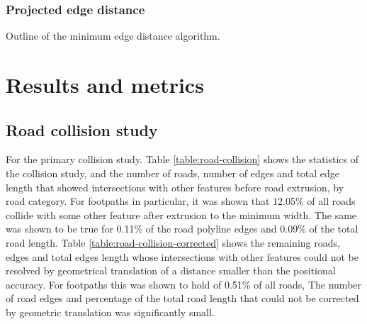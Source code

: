 \documentclass{kththesis}
\begin{document}
\subsection{Projected edge distance}

Outline of the minimum edge distance algorithm.

\chapter{Results and metrics}

\section{Road collision study}

For the primary collision study.
Table \ref{table:road-collision} shows the statistics of the collision study, and the number of roads, number of edges and total edge length that showed intersections with other features before road extrusion, by road category.
For footpaths in particular, it was shown that 12.05\% of all roads collide with some other feature after extrusion to the minimum width.
The same was shown to be true for 0.11\% of the road polyline edges and 0.09\% of the total road length.
Table \ref{table:road-collision-corrected} shows the remaining roads, edges and total edges length whose intersections with other features could not be resolved by geometrical translation of a distance smaller than the positional accuracy.
For footpaths this was shown to hold of 0.51\% of all roads, 
The number of road edges and percentage of the total road length that could not be corrected by geometric translation was significantly small.
\end{document}
